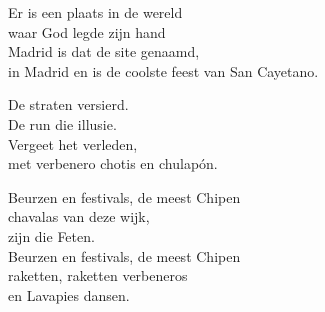 \clearpage
\begin{translation}
Er is een plaats in de wereld\\
waar God legde zijn hand\\
Madrid is dat de site genaamd,\\
in Madrid en is de coolste feest van San Cayetano.\vspace{\wlskip}

De straten versierd.\\
De run die illusie.\\
Vergeet het verleden,\\
met verbenero chotis en chulapón.\vspace{\wlskip}

Beurzen en festivals, de meest Chipen\\
chavalas van deze wijk,\\
zijn die Feten.\\
Beurzen en festivals, de meest Chipen\\
raketten, raketten verbeneros\\
en Lavapies dansen.
\end{translation}
